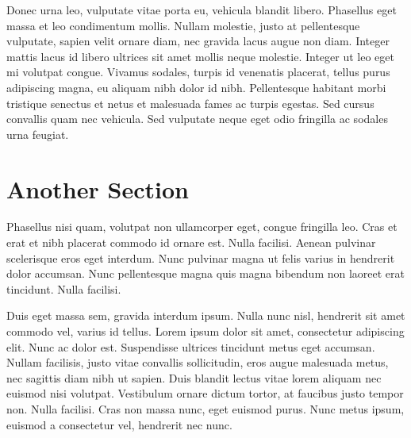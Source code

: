 Donec urna leo, vulputate vitae porta eu, vehicula blandit libero. Phasellus eget massa et leo condimentum mollis. Nullam molestie, justo at pellentesque vulputate, sapien velit ornare diam, nec gravida lacus augue non diam. Integer mattis lacus id libero ultrices sit amet mollis neque molestie. Integer ut leo eget mi volutpat congue. Vivamus sodales, turpis id venenatis placerat, tellus purus adipiscing magna, eu aliquam nibh dolor id nibh. Pellentesque habitant morbi tristique senectus et netus et malesuada fames ac turpis egestas. Sed cursus convallis quam nec vehicula. Sed vulputate neque eget odio fringilla ac sodales urna feugiat.

\section{Another Section}

Phasellus nisi quam, volutpat non ullamcorper eget, congue fringilla leo. Cras et erat et nibh placerat commodo id ornare est. Nulla facilisi. Aenean pulvinar scelerisque eros eget interdum. Nunc pulvinar magna ut felis varius in hendrerit dolor accumsan. Nunc pellentesque magna quis magna bibendum non laoreet erat tincidunt. Nulla facilisi.

Duis eget massa sem, gravida interdum ipsum. Nulla nunc nisl, hendrerit sit amet commodo vel, varius id tellus. Lorem ipsum dolor sit amet, consectetur adipiscing elit. Nunc ac dolor est. Suspendisse ultrices tincidunt metus eget accumsan. Nullam facilisis, justo vitae convallis sollicitudin, eros augue malesuada metus, nec sagittis diam nibh ut sapien. Duis blandit lectus vitae lorem aliquam nec euismod nisi volutpat. Vestibulum ornare dictum tortor, at faucibus justo tempor non. Nulla facilisi. Cras non massa nunc, eget euismod purus. Nunc metus ipsum, euismod a consectetur vel, hendrerit nec nunc.
